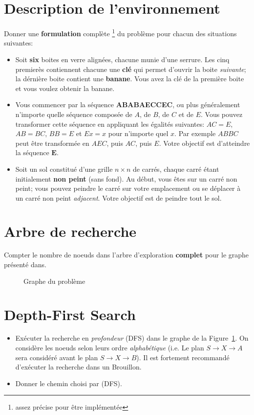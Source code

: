 \documentclass[12pt,letterpaper]{article}
\begin{document}
\section*{Description de l'environnement}%
\label{sec:description_de_l_environnement}
Donner une \textbf{formulation} complète \footnote{assez précise pour être
  implémentée} du problème pour chacun des situations
suivantes:

\begin{itemize}
  \item Soit \textbf{six} boites en verre alignées, chacune munie d'une serrure.
    Les cinq premierès contiennent chacune une \textbf{clé} qui permet d'ouvrir
    la boite \emph{suivante}; la dérnière boite contient une \textbf{banane}.
    Vous avez la clé de la première boite et vous voulez obtenir la banane.

  \item Vous commencer par la séquence \textbf{ABABAECCEC}, ou plus
    généralement n'importe quelle séquence composée de $A$, de $B$, de $C$
    et de $E$. Vous pouvez transformer cette séquence en appliquant les
    égalités suivantes: $AC=E$, $AB=BC$, $BB=E$ et $Ex=x$ pour n'importe
    quel $x$. Par exemple $ABBC$ peut être transformée en $AEC$, puis $AC$,
    puis $E$. Votre objectif est d'atteindre la séquence $\mathbf{E}$.
  \item Soit un sol constitué d'une grille $n \times n$ de carrés, chaque
    carré étant initialement \textbf{non peint} (sans fond). Au début, vous
    êtes sur  un carré non peint; vous pouvez peindre le carré sur votre
    emplacement ou se déplacer à un carré non peint \emph{adjacent}. Votre
    objectif est de peindre tout le sol.
\end{itemize}


\section*{Arbre de recherche }%
\label{sec:probleme_1}
 Compter le nombre de noeuds dans l'arbre d'exploration \textbf{complet} pour
 le graphe présenté dans. 

\begin{figure}[htpb]
  \centering
  
  \caption{Graphe du problème}
  \label{fig:q1_graph}
\end{figure}


\section*{Depth-First Search}%
\label{sec:depth_first_search}
\begin{itemize}
  \item 
Exécuter la recherche en \emph{profondeur} (DFS) dans le graphe de la
Figure~\ref{fig:q1_graph}. On considère les noeuds selon leurs ordre
\emph{alphabétique} (i.e. Le plan $S\rightarrow X \rightarrow A$ sera considéré avant le plan
$S\rightarrow X\rightarrow B$). Il est fortement recommandé d'exécuter la recherche dans un
Brouillon.

\item Donner le chemin choisi par (DFS).
\end{itemize}
\end{document}
